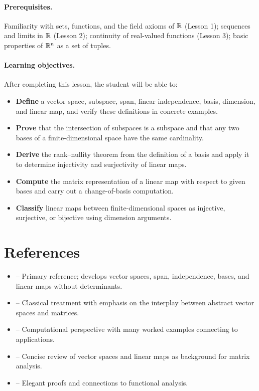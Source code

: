 \documentclass[11pt,a4paper]{article}
\begin{document}
\paragraph{Prerequisites.}
Familiarity with sets, functions, and the field axioms of $\mathbb{R}$ (Lesson 1);
sequences and limits in $\mathbb{R}$ (Lesson 2); continuity of real-valued functions
(Lesson 3); basic properties of $\mathbb{R}^n$ as a set of tuples.

\paragraph{Learning objectives.}
After completing this lesson, the student will be able to:
\begin{itemize}[nosep]
  \item \textbf{Define} a vector space, subspace, span, linear independence, basis,
        dimension, and linear map, and verify these definitions in concrete examples.
  \item \textbf{Prove} that the intersection of subspaces is a subspace and that any
        two bases of a finite-dimensional space have the same cardinality.
  \item \textbf{Derive} the rank--nullity theorem from the definition of a basis
        and apply it to determine injectivity and surjectivity of linear maps.
  \item \textbf{Compute} the matrix representation of a linear map with respect to
        given bases and carry out a change-of-basis computation.
  \item \textbf{Classify} linear maps between finite-dimensional spaces as injective,
        surjective, or bijective using dimension arguments.
\end{itemize}

\section{References}
\label{sec:references}

\begin{itemize}
  \item \citet[Chapters 1--3]{axler2015} -- Primary reference; develops vector
        spaces, span, independence, bases, and linear maps without determinants.
  \item \citet[Chapters 1--3]{hoffman1971} -- Classical treatment with emphasis on
        the interplay between abstract vector spaces and matrices.
  \item \citet[Chapters 1--3]{strang2016} -- Computational perspective with
        many worked examples connecting to applications.
  \item \citet[Chapter 1]{horn2013} -- Concise review of vector spaces and linear
        maps as background for matrix analysis.
  \item \citet[Chapters 1--4]{lax2007} -- Elegant proofs and connections to
        functional analysis.
\end{itemize}
\end{document}
